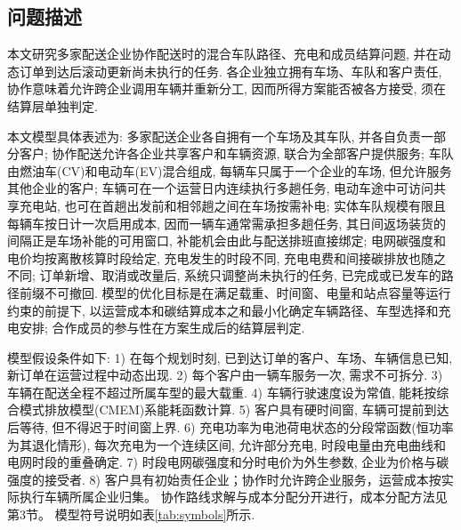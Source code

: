 \documentclass{setp-new}
\begin{document}
\subsection{问题描述}

本文研究多家配送企业协作配送时的混合车队路径、充电和成员结算问题,
并在动态订单到达后滚动更新尚未执行的任务.
各企业独立拥有车场、车队和客户责任, 协作意味着允许跨企业调用车辆并重新分工,
因而所得方案能否被各方接受, 须在结算层单独判定.

本文模型具体表述为:
多家配送企业各自拥有一个车场及其车队, 并各自负责一部分客户;
协作配送允许各企业共享客户和车辆资源, 联合为全部客户提供服务;
车队由燃油车(CV)和电动车(EV)混合组成, 每辆车只属于一个企业的车场, 但允许服务其他企业的客户;
车辆可在一个运营日内连续执行多趟任务,
电动车途中可访问共享充电站, 也可在首趟出发前和相邻趟之间在车场按需补电;
实体车队规模有限且每辆车按日计一次启用成本, 因而一辆车通常需承担多趟任务,
其日间返场装货的间隔正是车场补能的可用窗口, 补能机会由此与配送排班直接绑定;
电网碳强度和电价均按离散核算时段给定,
充电发生的时段不同, 充电电费和间接碳排放也随之不同;
订单新增、取消或改量后, 系统只调整尚未执行的任务, 已完成或已发车的路径前缀不可撤回.
模型的优化目标是在满足载重、时间窗、电量和站点容量等运行约束的前提下,
以运营成本和碳结算成本之和最小化确定车辆路径、车型选择和充电安排;
合作成员的参与性在方案生成后的结算层判定.

模型假设条件如下:
1) 在每个规划时刻, 已到达订单的客户、车场、车辆信息已知, 新订单在运营过程中动态出现.
2) 每个客户由一辆车服务一次, 需求不可拆分.
3) 车辆在配送全程不超过所属车型的最大载重.
4) 车辆行驶速度设为常值, 能耗按综合模式排放模型(CMEM)系能耗函数\cite{ref:27,ref:36}计算.
5) 客户具有硬时间窗, 车辆可提前到达后等待, 但不得迟于时间窗上界.
6) 充电功率为电池荷电状态的分段常函数(恒功率为其退化情形),
每次充电为一个连续区间, 允许部分充电, 时段电量由充电曲线和电网时段的重叠确定.
7) 时段电网碳强度和分时电价为外生参数, 企业为价格与碳强度的接受者.
8) 客户具有初始责任企业；协作时允许跨企业服务，运营成本按实际执行车辆所属企业归集。
协作路线求解与成本分配分开进行，成本分配方法见第3节。
模型符号说明如表\ref{tab:symbols}所示.
\end{document}
